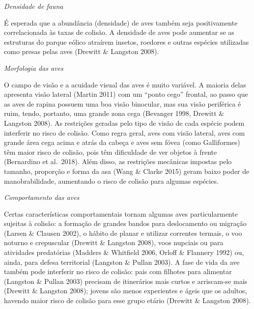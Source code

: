 \documentclass[
  oneside]{scrbook}
\begin{document}
\emph{Densidade de fauna}

É esperada que a abundância (densidade) de aves também seja positivamente correlacionada às taxas de colisão. A densidade de aves pode aumentar se as estruturas do parque eólico atraírem insetos, roedores e outras espécies utilizadas como presas pelas aves (Drewitt \& Langston 2008).

\emph{Morfologia das aves}

O campo de visão e a acuidade visual das aves é muito variável. A maioria delas apresenta visão lateral (Martin 2011) com um ``ponto cego'' frontal, ao passo que as aves de rapina possuem uma boa visão binocular, mas sua visão periférica é ruim, tendo, portanto, uma grande zona cega (Bevanger 1998, Drewitt \& Langston 2008). As restrições geradas pelo tipo de visão de cada espécie podem interferir no risco de colisão. Como regra geral, aves com visão lateral, aves com grande área cega acima e atrás da cabeça e aves sem fóvea (como Galliformes) têm maior risco de colisão, pois têm dificuldade de ver objetos à frente (Bernardino et al.~2018). Além disso, as restrições mecânicas impostas pelo tamanho, proporção e forma da asa (Wang \& Clarke 2015) geram baixo poder de manobrabilidade, aumentando o risco de colisão para algumas espécies.

\emph{Comportamento das aves}

Certas características comportamentais tornam algumas aves particularmente sujeitas à colisão: a formação de grandes bandos para deslocamento ou migração (Larsen \& Clausen 2002), o hábito de planar e utilizar correntes termais, o voo noturno e crepuscular (Drewitt \& Langston 2008), voos nupciais ou para atividades predatórias (Madders \& Whitfield 2006, Orloff \& Flannery 1992) ou, ainda, para defesa territorial (Langston \& Pullan 2003). A fase de vida da ave também pode interferir no risco de colisão: pais com filhotes para alimentar (Langston \& Pullan 2003) precisam de itinerários mais curtos e arriscam-se mais (Drewitt \& Langston 2008); jovens são menos experientes e ágeis que os adultos, havendo maior risco de colisão para esse grupo etário (Drewitt \& Langston 2008).
\end{document}
